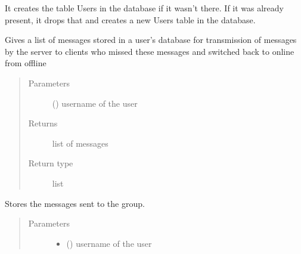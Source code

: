 \documentclass[letterpaper,10pt,english]{sphinxmanual}
\begin{document}
\begin{fulllineitems}
\begin{fulllineitems}
\end{fulllineitems}


\begin{fulllineitems}
\label{\detokenize{sql:sql.Database.make_users_table}}
It creates the table Users in the database if it wasn’t there. If it was already present, it drops that and creates a new Users table in the database.

\end{fulllineitems}


\begin{fulllineitems}
\label{\detokenize{sql:sql.Database.message_ret}}
Gives a list of messages stored in a user’s database for transmission of messages by the server to clients who missed these messages and switched back to online from offline
\begin{quote}\begin{description}
\item[{Parameters}] \leavevmode
{} () \textendash{} username of the user

\item[{Returns}] \leavevmode
list of messages

\item[{Return type}] \leavevmode
list

\end{description}\end{quote}

\end{fulllineitems}


\begin{fulllineitems}
\label{\detokenize{sql:sql.Database.message_sent_to_group}}
Stores the messages sent to the group.
\begin{quote}\begin{description}
\item[{Parameters}] \leavevmode\begin{itemize}
\item {} 
 () \textendash{} username of the user


\end{itemize}
\end{description}
\end{quote}
\end{fulllineitems}
\end{fulllineitems}
\end{document}
